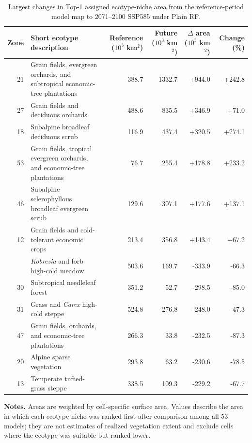 \documentclass[11pt]{article}
\begin{document}
\begin{table}[!htbp]
\centering
\caption{Largest changes in Top-1 assigned ecotype-niche area from the
reference-period model map to 2071--2100 SSP585 under Plain RF.}
\label{tab:zone_assignment_change_si}
\begin{threeparttable}
\centering
\scriptsize
\setlength{\tabcolsep}{4pt}
\begin{tabularx}{\textwidth}{@{}rXrrrr@{}}
\toprule
Zone & Short ecotype description &
\shortstack{Reference\\($10^3$ km$^2$)} &
\shortstack{Future\\($10^3$ km$^2$)} &
\shortstack{$\Delta$ area\\($10^3$ km$^2$)} &
Change (\%) \\
\midrule
21 & Grain fields, evergreen orchards, and subtropical economic-tree plantations & 388.7 & 1332.7 & +944.0 & +242.8 \\
27 & Grain fields and deciduous orchards & 488.6 & 835.5 & +346.9 & +71.0 \\
18 & Subalpine broadleaf deciduous scrub & 116.9 & 437.4 & +320.5 & +274.1 \\
53 & Grain fields, tropical evergreen orchards, and economic-tree plantations & 76.7 & 255.4 & +178.8 & +233.2 \\
46 & Subalpine sclerophyllous broadleaf evergreen scrub & 129.6 & 307.1 & +177.6 & +137.1 \\
12 & Grain fields and cold-tolerant economic crops & 213.4 & 356.8 & +143.4 & +67.2 \\
\addlinespace
16 & \textit{Kobresia} and forb high-cold meadow & 503.6 & 169.7 & -333.9 & -66.3 \\
30 & Subtropical needleleaf forest & 351.2 & 52.7 & -298.5 & -85.0 \\
31 & Grass and \textit{Carex} high-cold steppe & 524.8 & 276.8 & -248.0 & -47.3 \\
47 & Grain fields, orchards, and economic-tree plantations & 266.3 & 33.8 & -232.5 & -87.3 \\
20 & Alpine sparse vegetation & 293.8 & 63.2 & -230.6 & -78.5 \\
13 & Temperate tufted-grass steppe & 338.5 & 109.3 & -229.2 & -67.7 \\
\bottomrule
\end{tabularx}
\begin{tablenotes}[flushleft]
\footnotesize
\item[] \textbf{Notes.} Areas are weighted by cell-specific surface area.
Values describe the area in which each ecotype niche was ranked first after
comparison among all 53 models; they are not estimates of realized vegetation
extent and exclude cells where the ecotype was suitable but ranked lower.
\end{tablenotes}
\end{threeparttable}
\end{table}
\end{document}
